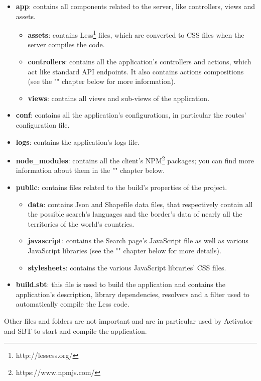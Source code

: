 \documentclass[a4paper,11pt]{report}
\begin{document}
\begin{itemize}
\item \textbf{app}: contains all components related to the server, like controllers, views and assets.
	\begin{itemize}
	\item \textbf{assets}: contains Less\footnote{http://lesscss.org/} files, which are converted to CSS files when the server compiles the code.
	\item \textbf{controllers}: contains all the application's controllers and actions, which act like standard API endpoints. It also contains actions compositions (see the "" chapter below for more information).
	\item \textbf{views}: contains all views and sub-views of the application.
	\end{itemize}
\item \textbf{conf}: contains all the application's configurations, in particular the routes' configuration file.
\item \textbf{logs}: contains the application's logs file.
\item \textbf{node\_modules}: contains all the client's NPM\footnote{https://www.npmjs.com/} packages; you can find more information about them in the "" chapter below.
\item \textbf{public}: contains files related to the build's properties of the project.
	\begin{itemize}
	\item \textbf{data}: contains Json and Shapefile data files, that respectively contain all the possible search's languages and the border's data of nearly all the territories of the world's countries.
	\item \textbf{javascript}: contains the Search page's JavaScript file as well as various JavaScript libraries (see the "" chapter below for more details).
	\item \textbf{stylesheets}: contains the various JavaScript libraries' CSS files.
	\end{itemize}
\item \textbf{build.sbt}: this file is used to build the application and contains the application's description, library dependencies, resolvers and a filter used to automatically compile the Less code.
\end{itemize}
Other files and folders are not important and are in particular used by Activator and SBT to start and compile the application.
\newpage
\end{document}
